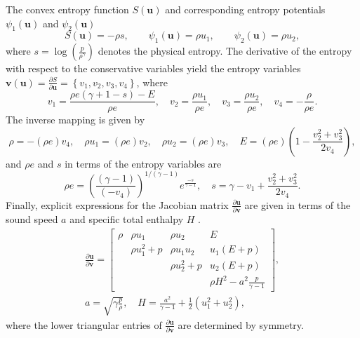 \documentclass{elsarticle}
\theoremstyle{definition}
\theoremstyle{plain}
\theoremstyle{plain}
\newcommand{\pd}[2]{\frac{\partial#1}{\partial#2}}
\newcommand{\reftwo}[1]{{\color{blue}#1}}
\renewcommand{\reftwo}[1]{#1}
\begin{document}
The convex entropy function $\reftwo{S(\bm{u})}$ and corresponding entropy potentials $\psi_1(\bm{u})$ and $\psi_2(\bm{u})$
\begin{equation*}
    S(\bm{u}) = -\rho s, \qquad \psi_1(\bm{u}) = \rho u_1, \qquad \psi_2(\bm{u}) = \rho u_2,
\end{equation*}
where $s = \log{\left(\frac{p}{\rho^{\gamma}} \right)}$
denotes the physical entropy. The derivative of the entropy with respect to the conservative variables yield the entropy variables $\bm{v}(\bm{u}) = \pd{S}{\bm{u}} = \left\{v_1, v_2, v_3, v_4 \right\}$, where
\begin{equation*}
    v_1 = \frac{\rho e \left(\gamma + 1 - s\right) \reftwo{-E}}{\rho e}, \quad v_2 = \frac{\rho u_1}{\rho e}, \quad v_{3} = \frac{\rho u_2}{\rho e}, \quad v_4 = -\frac{\rho}{\rho e}.
\end{equation*}
The inverse mapping is given by
\begin{equation*}
    \rho = -(\rho e)v_4, \quad \rho u_1 = (\rho e)v_2, \quad \rho u_2 = (\rho e) v_3, \quad E = (\rho e) \left(1 - \frac{v_2^2 + \reftwo{v_3^{2}}}{2v_4} \right),
\end{equation*}
and $\rho e$ and $s$ in terms of the entropy variables are
\begin{equation*}
    \rho e = \left(\frac{(\gamma -1)}{(-v_4)} \right)^{1/(\gamma - 1)} e^{\frac{-s}{\gamma - 1}}, \quad s = \gamma - v_1 + \frac{v_2^2 + \reftwo{v_3^2}}{2v_4}.
\end{equation*}
Finally, explicit expressions for the Jacobian matrix $\pd{\bm{u}}{\bm{v}}$ are given in terms of the sound speed $a$ and specific total enthalpy $H$ \cite{barth1999numerical}. 
\begin{equation*}
\begin{gathered}
    \pd{\bm{u}}{\bm{v}} = 
    \begin{bmatrix}
        \rho & \rho u_1       & \rho u_2     & E\\
             & \rho u_1^2 + p & \rho u_1 u_2 & u_1 (E + p)\\
             & & \rho u_2^2 + p & u_2(E + p) \\
             & & & \rho H^2 - a^2\frac{p}{\gamma -1}
    \end{bmatrix},\\
    a = \sqrt{\gamma \frac{p}{\rho}}, \quad H = \frac{a^2}{\gamma -1} + \frac{1}{2}(u_1^2 + u_2^2),
\end{gathered}
\end{equation*}
where the lower triangular entries of $\pd{\bm{u}}{\bm{v}}$ are determined by symmetry. 
\end{document}
